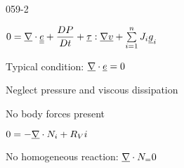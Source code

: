 \begin{mitframe}{059-2}
\begin{listone}
	\item $0=\gradop\cdot\uline{\mcef}+\dfrac{\elecdisplace\p}{\elecdisplace{t}}+\uline{\torque}:\gradop\uline{\vvel}+\sum\limits_{\state=1}^{n}\molspecflux\uline{\grav}_{\state}$
    		\begin{listtwo}
            		\item Typical condition: $\gradop\cdot\mcef=0$
                    		\begin{listthree}
                            		\item Neglect pressure and viscous dissipation
                                    \item No body forces present
                            \end{listthree}
            \end{listtwo}
\item $0=-\gradop\cdot\massspecflux{i}+\specsource{i}$
			\begin{listtwo}
            		\item No homogeneous reaction: $\gradop\cdot\massspecflux=0$
            \end{listtwo}
\end{listone}        
\end{mitframe}